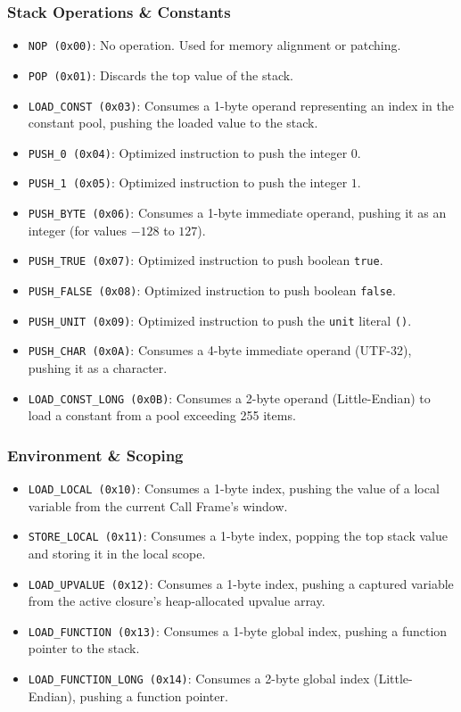 \documentclass[11pt, a4paper]{article}
\begin{document}
\subsubsection*{Stack Operations \& Constants}
\begin{itemize}
    \item \texttt{NOP (0x00)}: No operation. Used for memory alignment or patching.
    \item \texttt{POP (0x01)}: Discards the top value of the stack.
    \item \texttt{LOAD\_CONST (0x03)}: Consumes a 1-byte operand representing an index in the constant pool, pushing the loaded value to the stack.
    \item \texttt{PUSH\_0 (0x04)}: Optimized instruction to push the integer $0$.
    \item \texttt{PUSH\_1 (0x05)}: Optimized instruction to push the integer $1$.
    \item \texttt{PUSH\_BYTE (0x06)}: Consumes a 1-byte immediate operand, pushing it as an integer (for values $-128$ to $127$).
    \item \texttt{PUSH\_TRUE (0x07)}: Optimized instruction to push boolean \texttt{true}.
    \item \texttt{PUSH\_FALSE (0x08)}: Optimized instruction to push boolean \texttt{false}.
    \item \texttt{PUSH\_UNIT (0x09)}: Optimized instruction to push the \texttt{unit} literal \texttt{()}.
    \item \texttt{PUSH\_CHAR (0x0A)}: Consumes a 4-byte immediate operand (UTF-32), pushing it as a character.
    \item \texttt{LOAD\_CONST\_LONG (0x0B)}: Consumes a 2-byte operand (Little-Endian) to load a constant from a pool exceeding 255 items.
\end{itemize}

\subsubsection*{Environment \& Scoping}
\begin{itemize}
    \item \texttt{LOAD\_LOCAL (0x10)}: Consumes a 1-byte index, pushing the value of a local variable from the current Call Frame's window.
    \item \texttt{STORE\_LOCAL (0x11)}: Consumes a 1-byte index, popping the top stack value and storing it in the local scope.
    \item \texttt{LOAD\_UPVALUE (0x12)}: Consumes a 1-byte index, pushing a captured variable from the active closure's heap-allocated upvalue array.
    \item \texttt{LOAD\_FUNCTION (0x13)}: Consumes a 1-byte global index, pushing a function pointer to the stack.
    \item \texttt{LOAD\_FUNCTION\_LONG (0x14)}: Consumes a 2-byte global index (Little-Endian), pushing a function pointer.
\end{itemize}
\end{document}
